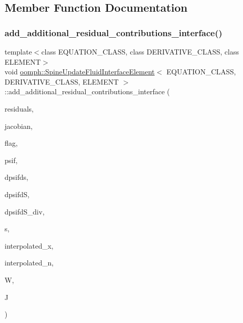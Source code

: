 \subsection{Member Function Documentation}
\mbox{\label{classoomph_1_1SpineUpdateFluidInterfaceElement_a3958845051cafecd8e73745fc04c7a78}} 
\subsubsection{\texorpdfstring{add\+\_\+additional\+\_\+residual\+\_\+contributions\+\_\+interface()}{add\_additional\_residual\_contributions\_interface()}}
{\footnotesize\ttfamily template$<$class E\+Q\+U\+A\+T\+I\+O\+N\+\_\+\+C\+L\+A\+SS, class D\+E\+R\+I\+V\+A\+T\+I\+V\+E\+\_\+\+C\+L\+A\+SS, class E\+L\+E\+M\+E\+NT$>$ \\
void \hyperlink{classoomph_1_1SpineUpdateFluidInterfaceElement}{oomph\+::\+Spine\+Update\+Fluid\+Interface\+Element}$<$ E\+Q\+U\+A\+T\+I\+O\+N\+\_\+\+C\+L\+A\+SS, D\+E\+R\+I\+V\+A\+T\+I\+V\+E\+\_\+\+C\+L\+A\+SS, E\+L\+E\+M\+E\+NT $>$\+::add\+\_\+additional\+\_\+residual\+\_\+contributions\+\_\+interface (\begin{DoxyParamCaption}\item[{Vector$<$ double $>$ \&}]{residuals,  }\item[{Dense\+Matrix$<$ double $>$ \&}]{jacobian,  }\item[{const unsigned \&}]{flag,  }\item[{const Shape \&}]{psif,  }\item[{const D\+Shape \&}]{dpsifds,  }\item[{const D\+Shape \&}]{dpsifdS,  }\item[{const D\+Shape \&}]{dpsifd\+S\+\_\+div,  }\item[{const Vector$<$ double $>$ \&}]{s,  }\item[{const Vector$<$ double $>$ \&}]{interpolated\+\_\+x,  }\item[{const Vector$<$ double $>$ \&}]{interpolated\+\_\+n,  }\item[{const double \&}]{W,  }\item[{const double \&}]{J }\end{DoxyParamCaption})\hspace{0.3cm}{\ttfamily [inline]}}



